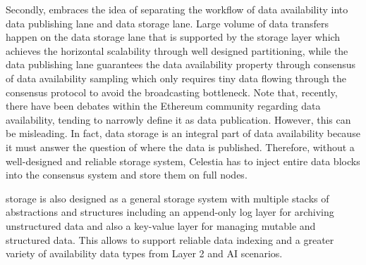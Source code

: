 Secondly, \projabbrev embraces the idea of separating the workflow of data availability into data publishing lane and data storage lane. 
Large volume of data transfers happen on the data storage lane that is supported by the storage layer which achieves the horizontal scalability through well designed partitioning, while the data publishing lane guarantees the data availability property through consensus of data availability sampling which only requires tiny data flowing through the consensus protocol to avoid the broadcasting bottleneck. 
Note that, recently, there have been debates within the Ethereum community regarding data availability, tending to narrowly define it as data publication. However, this can be misleading. In fact, data storage is an integral part of data availability because it must answer the question of where the data is published. Therefore, without a well-designed and reliable storage system, Celestia has to inject entire data blocks into the consensus system and store them on full nodes.

\projabbrev storage is also designed as a general storage system with multiple stacks of abstractions and structures including an append-only log layer for archiving unstructured data and also a key-value layer for managing mutable and structured data. This allows \projabbrev to support reliable data indexing and a greater variety of availability data types from Layer 2 and AI scenarios.  




 


